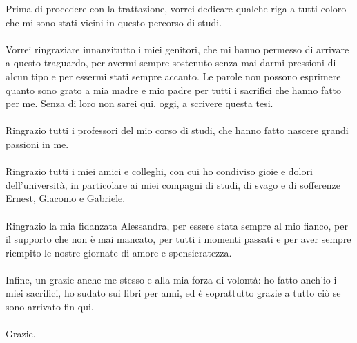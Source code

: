 \documentclass[noexaminfo,oneside,binding=0.6cm]{sapthesis}
\begin{document}
	\begin{acknowledgments}\pagestyle{empty}\thispagestyle{empty}Prima di procedere con la trattazione, vorrei dedicare qualche riga a tutti coloro che mi sono stati vicini in questo percorso di studi.\\\\
	Vorrei ringraziare innanzitutto i miei genitori, che mi hanno permesso di arrivare a questo traguardo, per avermi sempre sostenuto senza mai darmi pressioni di alcun tipo e per essermi stati sempre accanto. Le parole non possono esprimere quanto sono grato a mia madre e mio padre per tutti i sacrifici che hanno fatto per me. Senza di loro non sarei qui, oggi, a scrivere questa tesi.\\\\
	Ringrazio tutti i professori del mio corso di studi, che hanno fatto nascere grandi passioni in me.\\\\
	Ringrazio tutti i miei amici e colleghi, con cui ho condiviso gioie e dolori dell'università, in particolare ai miei compagni di studi, di svago e di sofferenze Ernest, Giacomo e Gabriele.\\\\
	Ringrazio la mia fidanzata Alessandra, per essere stata sempre al mio fianco, per il supporto che non è mai mancato, per tutti i momenti passati e per aver sempre riempito le nostre giornate di amore e spensieratezza.\\\\
	Infine, un grazie anche me stesso e alla mia forza di volontà: ho fatto anch'io i miei sacrifici, ho sudato sui libri per anni, ed è soprattutto grazie a tutto ciò se sono arrivato fin qui.\\\\
	Grazie.
	\end{acknowledgments}
	
	\setcounter{page}{5}
	\tableofcontents
	
	
	\mainmatter
	\setcounter{page}{1}
	
	
	
	
	
	
	
\end{document}
